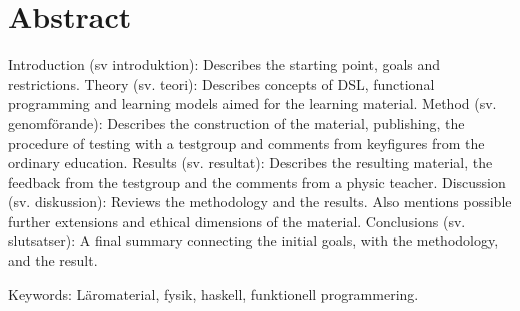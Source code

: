 \setlength{\parskip}{0.5cm}

\thispagestyle{plain}			%
\section*{Abstract}

\begin{binge}






    Introduction (sv introduktion): Describes the starting point, goals and restrictions.
    Theory (sv. teori): Describes concepts of DSL, functional programming and learning models aimed for the learning material.
    Method (sv. genomförande): Describes the construction of the material, publishing, the procedure of testing with a testgroup and comments from keyfigures from the ordinary education.
    Results (sv. resultat): Describes the resulting material, the feedback from the testgroup and the comments from a physic teacher.
    Discussion (sv. diskussion): Reviews the methodology and the results. Also mentions possible further extensions and ethical dimensions of the material.
    Conclusions (sv. slutsatser): A final summary connecting the initial goals, with the methodology, and the result.


\vfill
Keywords: Läromaterial, fysik, haskell, funktionell programmering.
\end{binge}

\newpage				%
\thispagestyle{empty}
\mbox{}

